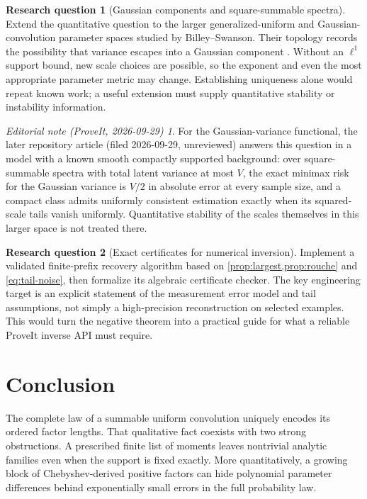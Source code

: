 \documentclass[11pt,a4paper]{article}
\theoremstyle{definition}
\newtheorem{question}{Research question}
\theoremstyle{remark}
\newtheorem*{ednote}{Editorial note (ProveIt, 2026-09-29)}
\begin{document}
\begin{question}[Gaussian components and square-summable spectra]
Extend the quantitative question to the larger generalized-uniform and
Gaussian-convolution parameter spaces studied by Billey--Swanson.
Their topology records the possibility that variance escapes into a
Gaussian component \cite{BilleySwanson}. Without an $\ell^1$ support
bound, new scale choices are possible, so the exponent and even the most
appropriate parameter metric may change. Establishing uniqueness alone
would repeat known work; a useful extension must supply quantitative
stability or instability information.
\end{question}
\begin{ednote}
For the Gaussian-variance functional, the later repository article
 (filed 2026-09-29, unreviewed) answers this question in a
model with a known smooth compactly supported background: over
square-summable spectra with total latent variance at most $V$, the exact
minimax risk for the Gaussian variance is $V/2$ in absolute error at every
sample size, and a compact class admits uniformly consistent estimation
exactly when its squared-scale tails vanish uniformly. Quantitative
stability of the scales themselves in this larger space is not treated
there.
\end{ednote}

\begin{question}[Exact certificates for numerical inversion]
Implement a validated finite-prefix recovery algorithm based on
\cref{prop:largest,prop:rouche} and \eqref{eq:tail-noise}, then formalize
its algebraic certificate checker. The key engineering target is an
explicit statement of the measurement error model and tail assumptions,
not simply a high-precision reconstruction on selected examples. This
would turn the negative theorem into a practical guide for what a
reliable ProveIt inverse API must require.
\end{question}

\section{Conclusion}

The complete law of a summable uniform convolution uniquely encodes its
ordered factor lengths. That qualitative fact coexists with two strong
obstructions. A prescribed finite list of moments leaves nontrivial
analytic families even when the support is fixed exactly. More
quantitatively, a growing block of Chebyshev-derived positive factors can
hide polynomial parameter differences behind exponentially small errors
in the full probability law.
\end{document}
